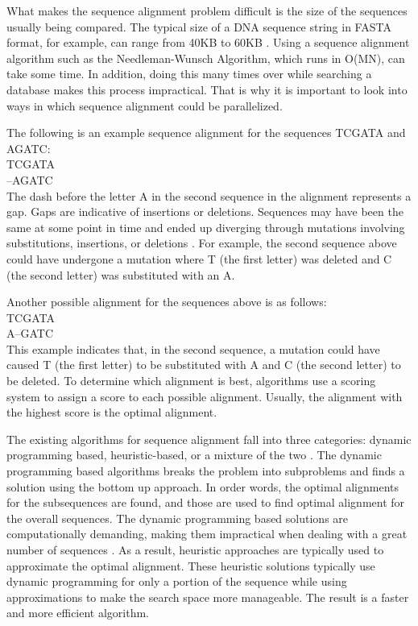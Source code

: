 \documentclass[conference]{IEEEtran}
\begin{document}
What makes the sequence alignment problem difficult is the size of the sequences usually being compared. The typical size of a DNA sequence string in FASTA format, for example, can range from 40KB to 60KB \cite{naveed_siddiqui_ahmed}. Using a sequence alignment algorithm such as the Needleman-Wunsch Algorithm, which runs in O(MN), can take some time. In addition, doing this many times over while searching a database makes this process impractical. That is why it is important to look into ways in which sequence alignment could be parallelized.

The following is an example sequence alignment for the sequences TCGATA and AGATC:\\

\hspace*{1em}TCGATA\\
\hspace*{2em}–AGATC\\
 
The dash before the letter A in the second sequence in the alignment represents a gap. Gaps are indicative of insertions or deletions. Sequences may have been the same at some point in time and ended up diverging through mutations involving substitutions, insertions, or deletions \cite{settles_2008}. For example, the second sequence above could have undergone a mutation where T (the first letter) was deleted and C (the second letter) was substituted with an A.

Another possible alignment for the sequences above is as follows:\\

\hspace*{1em}TCGATA\\
\hspace*{2em}A–GATC\\

This example indicates that, in the second sequence, a mutation could have caused T (the first letter) to be substituted with A and C (the second letter) to be deleted. To determine which alignment is best, algorithms use a scoring system to assign a score to each possible alignment. Usually, the alignment with the highest score is the optimal alignment.

The existing algorithms for sequence alignment fall into three categories: dynamic programming based, heuristic-based, or a mixture of the two \cite{chaudhary_liu_matta_yang_2005}. The dynamic programming based algorithms breaks the problem into subproblems and finds a solution using the bottom up approach. In order words, the optimal alignments for the subsequences are found, and those are used to find optimal alignment for the overall sequences. The dynamic programming based solutions are computationally demanding, making them impractical when dealing with a great number of sequences \cite{chaudhary_liu_matta_yang_2005}. As a result, heuristic approaches are typically used to approximate the optimal alignment. These heuristic solutions typically use dynamic programming for only a portion of the sequence while using approximations to make the search space more manageable. The result is a faster and more efficient algorithm.
\end{document}

